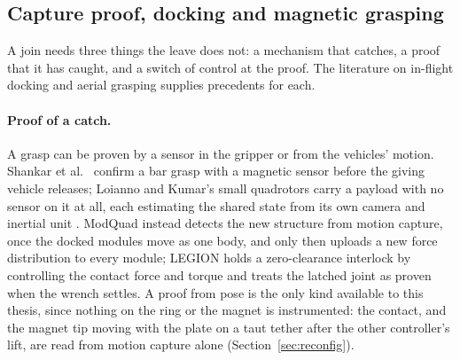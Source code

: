 
\subsection{Capture proof, docking and magnetic grasping}
\label{sec:lit_capture}

A join needs three things the leave does not: a mechanism that catches, a proof that it has caught, and a switch
of control at the proof. The literature on in-flight docking and aerial grasping supplies precedents for each.

\paragraph{Proof of a catch.} A grasp can be proven by a sensor in the gripper or from the vehicles' motion. Shankar
et al.\ \cite{shankar2020inflight} confirm a bar grasp with a magnetic sensor before the giving vehicle releases; Loianno and Kumar's small
quadrotors carry a payload with no sensor on it at all, each estimating the shared state from its own camera and
inertial unit \cite{loianno2018cooperative}. ModQuad
\cite{saldana2018modquad} instead detects the new structure from motion capture, once the docked modules move as
one body, and only then uploads a new force distribution to every module; LEGION \cite{sugihara2026legion} holds a
zero-clearance interlock by controlling the contact force and torque and treats the latched joint as proven when
the wrench settles. A proof from pose is the only kind available to this thesis, since nothing on the ring or the
magnet is instrumented: the contact, and the magnet tip moving with the plate on a taut tether after the other
controller's lift, are read from motion capture alone (Section~\ref{sec:reconfig}).


